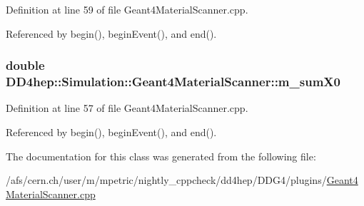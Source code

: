 Definition at line 59 of file Geant4MaterialScanner.cpp.

Referenced by begin(), beginEvent(), and end().\hypertarget{class_d_d4hep_1_1_simulation_1_1_geant4_material_scanner_aa34c1dce75b345ef9586ad6f0cc24382}{
\subsubsection[{m\_\-sumX0}]{\setlength{\rightskip}{0pt plus 5cm}double {\bf DD4hep::Simulation::Geant4MaterialScanner::m\_\-sumX0}}}
\label{class_d_d4hep_1_1_simulation_1_1_geant4_material_scanner_aa34c1dce75b345ef9586ad6f0cc24382}


Definition at line 57 of file Geant4MaterialScanner.cpp.

Referenced by begin(), beginEvent(), and end().

The documentation for this class was generated from the following file:\begin{DoxyCompactItemize}
\item 
/afs/cern.ch/user/m/mpetric/nightly\_\-cppcheck/dd4hep/DDG4/plugins/\hyperlink{_geant4_material_scanner_8cpp}{Geant4MaterialScanner.cpp}\end{DoxyCompactItemize}
